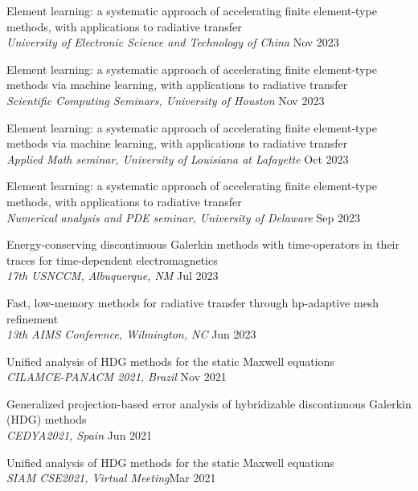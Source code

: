 \documentclass[11pt]{res}
\newenvironment{cvenumerate}{\begin{etaremune}\itemsep -2pt}{\end{etaremune}\vspace{-5pt}}
\begin{document}
\begin{resume}
\begin{cvenumerate}
\item 
Element learning: a systematic approach of accelerating finite element-type methods, with applications to radiative transfer\\
{\sl University of Electronic Science and Technology of China}
\hfill Nov 2023

\item 
Element learning: a systematic approach of accelerating finite element-type methods via machine learning, with applications to radiative transfer\\
{\sl Scientific Computing Seminars, University of Houston}
\hfill Nov 2023

\item 
Element learning: a systematic approach of accelerating finite element-type methods via machine learning, with applications to radiative transfer\\
{\sl Applied Math seminar, University of Louisiana at Lafayette}
\hfill Oct 2023

\item 
Element learning: a systematic approach of accelerating finite element-type methods, with applications to radiative transfer\\
{\sl Numerical analysis and PDE seminar, University of Delaware}
\hfill Sep 2023

\item
Energy-conserving discontinuous Galerkin methods
with time-operators in their traces for time-dependent
electromagnetics\\
{\sl 17th USNCCM, Albuquerque, NM}
\hfill Jul 2023

\item
Fast, low-memory methods for radiative transfer
through hp-adaptive mesh refinement\\
{\sl 13th AIMS Conference, Wilmington, NC}
\hfill Jun 2023

\item
Unified analysis of HDG methods for the static Maxwell equations\\
{\sl CILAMCE-PANACM 2021, Brazil} \hfill Nov 2021

\item Generalized projection-based error analysis of
hybridizable discontinuous Galerkin (HDG) methods\\
{\sl CEDYA2021, Spain} \hfill Jun 2021

\item Unified analysis of HDG methods for the static Maxwell equations\\
{\sl SIAM CSE2021, Virtual Meeting}\hfill Mar 2021


\end{cvenumerate}
\end{resume}
\end{document}
